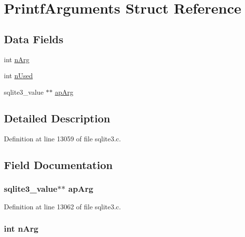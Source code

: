 \hypertarget{struct_printf_arguments}{}\section{Printf\+Arguments Struct Reference}
\label{struct_printf_arguments}
\subsection*{Data Fields}
\begin{DoxyCompactItemize}
\item 
int \hyperlink{struct_printf_arguments_a45abc5cec29aa0c4355db173a21a48f0}{n\+Arg}
\item 
int \hyperlink{struct_printf_arguments_a927a6abaaf5a39d3d4bc2345084668d5}{n\+Used}
\item 
sqlite3\+\_\+value $\ast$$\ast$ \hyperlink{struct_printf_arguments_ac5f9ad0f71bed554e4932d64f368a70c}{ap\+Arg}
\end{DoxyCompactItemize}


\subsection{Detailed Description}


Definition at line 13059 of file sqlite3.\+c.



\subsection{Field Documentation}
\hypertarget{struct_printf_arguments_ac5f9ad0f71bed554e4932d64f368a70c}{}
\subsubsection[{ap\+Arg}]{\setlength{\rightskip}{0pt plus 5cm}sqlite3\+\_\+value$\ast$$\ast$ ap\+Arg}\label{struct_printf_arguments_ac5f9ad0f71bed554e4932d64f368a70c}


Definition at line 13062 of file sqlite3.\+c.

\hypertarget{struct_printf_arguments_a45abc5cec29aa0c4355db173a21a48f0}{}
\subsubsection[{n\+Arg}]{\setlength{\rightskip}{0pt plus 5cm}int n\+Arg}\label{struct_printf_arguments_a45abc5cec29aa0c4355db173a21a48f0}


